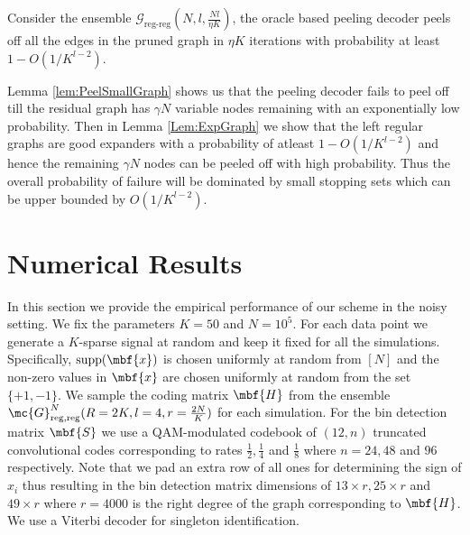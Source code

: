\documentclass[conference]{IEEEtran}
\begin{document}
\begin{theorem}
Consider the ensemble $\mathcal{G}_{\text{reg-reg}}(N,l,\frac{Nl}{\eta K})$, the oracle based peeling decoder peels off all the edges in the pruned graph in $\eta K$ iterations with probability at least $1-O\left(1/K^{l-2}\right)$.
\end{theorem}
\begin{IEEEproof}
 Lemma \ref{lem:PeelSmallGraph} shows us that the peeling decoder fails to peel off till the residual graph has $\gamma N$ variable nodes remaining with an exponentially low probability. Then in Lemma \ref{Lem:ExpGraph} we show that the left regular graphs are good expanders with a probability of atleast $1-O(1/K^{l-2})$ and hence the remaining $\gamma N$ nodes can be peeled off with high probability. Thus the overall probability of failure will be dominated by small stopping sets which can be upper bounded by $O(1/K^{l-2})$.
\end{IEEEproof}
\vspace{3ex}

\section{Numerical Results}
In this section we provide the empirical performance of our scheme in the noisy setting. We fix the parameters $K=50$ and $N=10^5$. For each data point we generate a $K$-sparse signal at random and keep it fixed for all the simulations. Specifically, $\text{supp}(\mbf{x})$ is chosen uniformly at random from $[N]$ and the non-zero values in $\mbf{x}$ are chosen uniformly at random from the set $\{+1,-1\}$. We sample the coding matrix $\mbf{H}$ from the ensemble $\mc{G}_{\text{reg,reg}}^{N}(R=2K,l=4,r=\frac{2N}{K})$ for each simulation. For the bin detection matrix $\mbf{S}$ we use a QAM-modulated codebook of $(12,n)$ truncated convolutional codes corresponding to rates $\frac{1}{2},\frac{1}{4}$ and $\frac{1}{8}$ where $n=24,48$ and $96$ respectively. Note that we pad an extra row of all ones for determining the sign of $x_i$ thus resulting in the bin detection matrix dimensions of $13\times r, 25\times r$ and $49\times r$ where $r=4000$ is the right degree of the graph corresponding to $\mbf{H}$. We use a Viterbi decoder for singleton identification.
\end{document}
